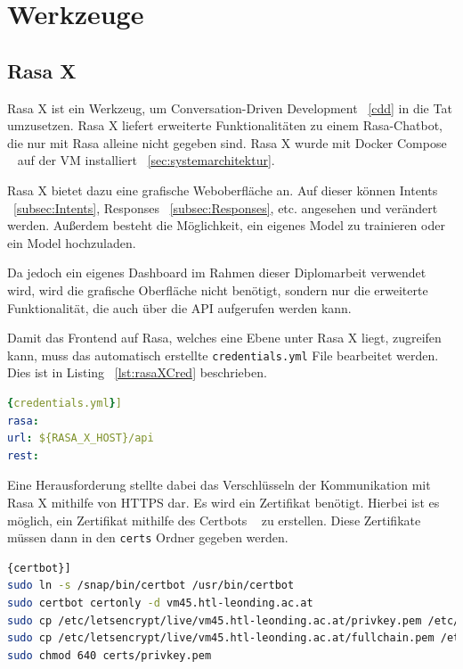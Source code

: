 \section{Werkzeuge}

\subsection{Rasa X}\label{subsec:rasa-x}
Rasa X ist ein Werkzeug, um Conversation-Driven Development ~\ref{cdd} in die Tat umzusetzen.\cite{rasax}
Rasa X liefert erweiterte Funktionalitäten zu einem Rasa-Chatbot, die nur mit Rasa alleine nicht gegeben sind.
Rasa X wurde mit Docker Compose ~\cite{rasaxDocker} auf der VM installiert ~\ref{sec:systemarchitektur}.

Rasa X bietet dazu eine grafische Weboberfläche an.
Auf dieser können Intents ~\ref{subsec:Intents}, Responses ~\ref{subsec:Responses}, etc. angesehen und verändert werden.
Außerdem besteht die Möglichkeit, ein eigenes Model zu trainieren oder ein Model hochzuladen.

Da jedoch ein eigenes Dashboard im Rahmen dieser Diplomarbeit verwendet wird, wird die grafische Oberfläche nicht benötigt, sondern nur die erweiterte Funktionalität, die auch über die API aufgerufen werden kann.

Damit das Frontend auf Rasa, welches eine Ebene unter Rasa X liegt, zugreifen kann, muss das automatisch erstellte \texttt{credentials.yml} File bearbeitet werden.
Dies ist in Listing ~\ref{lst:rasaXCred} beschrieben.

\begin{lstlisting}[language=yaml,label={lst:rasaXCred},caption={credentials.yml}]{credentials.yml}]
rasa:
url: ${RASA_X_HOST}/api
rest:
\end{lstlisting}

Eine Herausforderung stellte dabei das Verschlüsseln der Kommunikation mit Rasa X mithilfe von HTTPS dar.
Es wird ein Zertifikat benötigt.
Hierbei ist es möglich, ein Zertifikat mithilfe des Certbots ~\cite{certbot} zu erstellen.
Diese Zertifikate müssen dann in den \texttt{certs} Ordner gegeben werden.

\begin{lstlisting}[language=bash,label={lst:certbot},caption={Install certbot and create certificates}]{certbot}]
sudo ln -s /snap/bin/certbot /usr/bin/certbot
sudo certbot certonly -d vm45.htl-leonding.ac.at
sudo cp /etc/letsencrypt/live/vm45.htl-leonding.ac.at/privkey.pem /etc/rasa/certs/
sudo cp /etc/letsencrypt/live/vm45.htl-leonding.ac.at/fullchain.pem /etc/rasa/certs/
sudo chmod 640 certs/privkey.pem
\end{lstlisting}


